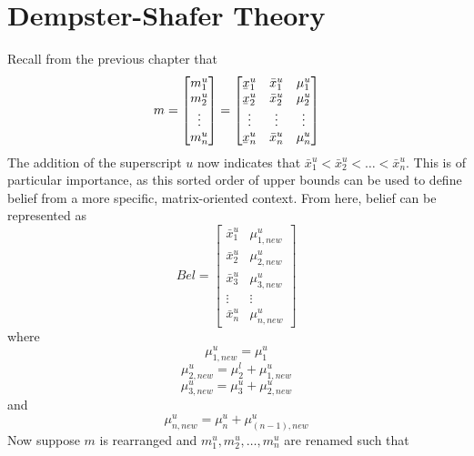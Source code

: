 \documentclass[12pt]{uthesis-v12}  %
\newcommand{\ubar}[1]{\underaccent{\bar}{#1}}
\begin{document}
\section{Dempster-Shafer Theory}

Recall from the previous chapter that
\begin{equation}
m = \begin{bmatrix*}
m_1^u \\
m_2^u \\
\vdots \\
m_n^u \end{bmatrix*}
= \begin{bmatrix*}
\ubar{x}_1^u & \bar{x}_1^u & \mu_1^u \\
\ubar{x}_2^u & \bar{x}_2^u & \mu_2^u \\
\vdots & \vdots & \vdots \\
\ubar{x}_n^u & \bar{x}_n^u & \mu_n^u \\ \end{bmatrix*}
\label{m-1}
\end{equation}
\noindent The addition of the superscript $u$ now indicates that $\bar{x}_1^u < \bar{x}_2^u < \dots < \bar{x}_n^u$. This is of particular importance, as this sorted order of upper bounds can be used to define belief from a more specific, matrix-oriented context. From here, belief can be represented as
\begin{equation}
Bel = \begin{bmatrix*}
\bar{x}_1^u & \mu_{1,new}^u \\
\bar{x}_2^u & \mu_{2,new}^u \\
\bar{x}_3^u & \mu_{3,new}^u \\
\vdots & \vdots \\
\bar{x}_n^u & \mu_{n,new}^u \end{bmatrix*}
\label{m}
\end{equation}
where 
\begin{equation}
\mu_{1,new}^u = \mu_1^u
\label{mu1l}
\end{equation}
\begin{equation}
\mu_{2,new}^u = \mu_2^l+\mu_{1,new}^u
\label{mu2l}
\end{equation}
\begin{equation}
\mu_{3,new}^u = \mu_3^u+\mu_{2,new}^u
\label{mu3l}
\end{equation}
\noindent and
\begin{equation}
\mu_{n,new}^u = \mu_n^u+\mu_{(n-1),new}^u
\label{munl}
\end{equation}
\noindent Now suppose $m$ is rearranged and $m_{1}^{u}, m_{2}^{u},\dots, m_{n}^{u}$ are renamed such that 
\end{document}
